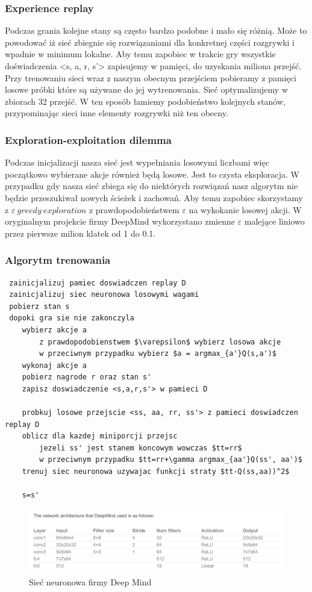 \documentclass[12pt]{article}
\begin{document}
\subsubsection{Experience replay}

Podczas grania kolejne stany są często bardzo podobne i mało się różnią. Może to powodować iż sieć zbiegnie się rozwiązaniami dla konkretnej części rozgrywki i wpadnie w minimum lokalne. Aby temu zapobiec w trakcie gry wszystkie doświadczenia <s, a, r, s'> zapisujemy w pamięci, do uzyskania miliona przejść.  Przy trenowaniu sieci wraz z naszym obecnym przejściem pobieramy z pamięci losowe próbki które są używane do jej wytrenowania. Sieć optymalizujemy w zbiorach 32 przejść. W ten sposób łamiemy podobieństwo kolejnych stanów, przypominając sieci inne elementy rozgrywki niż ten obecny. 

\subsubsection{Exploration-exploitation dilemma}

Podczas inicjalizacji nasza sieć jest wypełniania losowymi liczbami więc początkowo wybierane akcje również będą losowe. Jest to czysta eksploracja. W przypadku gdy nasza sieć zbiega się do niektórych rozwiązań nasz algorytm nie będzie przeszukiwał nowych ścieżek i zachowań. Aby temu zapobiec skorzystamy z $\varepsilon\ greedy\ exploration$ z prawdopodobieństwem $\varepsilon$ na wykokanie losowej akcji. W oryginalnym projekcie firmy DeepMind wykorzystano zmienne $\varepsilon$ malejące liniowo przez pierwsze milion klatek od 1 do 0.1.

\subsubsection{Algorytm trenowania}

\begin{lstlisting}
 zainicjalizuj pamiec doswiadczen replay D
 zainicjalizuj siec neuronowa losowymi wagami
 pobierz stan s
 dopoki gra sie nie zakonczyla
	wybierz akcje a
		z prawdopodobienstwem $\varepsilon$ wybierz losowa akcje
		w przeciwnym przypadku wybierz $a = argmax_{a'}Q(s,a')$
	wykonaj akcje a
	pobierz nagrode r oraz stan s'
	zapisz doswiadczenie <s,a,r,s'> w pamieci D
	
	probkuj losowe przejscie <ss, aa, rr, ss'> z pamieci doswiadczen replay D
	oblicz dla kazdej miniporcji przejsc
		jezeli ss' jest stanem koncowym wowczas $tt=rr$
		w przeciwnym przypadku $tt=rr+\gamma argmax_{aa'}Q(ss', aa')$
	trenuj siec neuronowa uzywajac funkcji straty $tt-Q(ss,aa))^2$
	
	s=s'

\end{lstlisting}

\begin{figure}[H]
\centering \includegraphics[scale=0.7]{deep_mind_architecture.PNG}
\caption{Sieć neuronowa firmy Deep Mind}
\label{simple1}
\end{figure}
\end{document}
